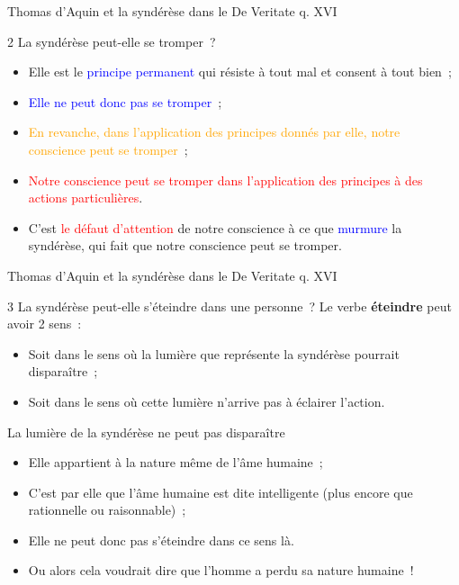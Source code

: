 \documentclass[11pt,xcolor=dvipsname,ignorenonframetext,handout]{beamer}
\begin{document}
\begin{frame}{Thomas d'Aquin et la syndérèse dans le De Veritate q. XVI}
    \begin{block}{2 La syndérèse peut-elle se tromper~?}
        \begin{itemize}
            \rightskip=0pt\leftskip=0pt
            \item Elle est le \textcolor{blue}{principe permanent} qui résiste à tout mal et consent à tout bien~;
            \item \textcolor{blue}{Elle ne peut donc pas se tromper}~;
            \item \textcolor{orange}{En revanche, dans l'application des principes donnés par elle, notre conscience peut se tromper}~;
            \item \textcolor{red}{Notre conscience peut se tromper dans l'application des principes à des actions particulières}.
            \item C'est \textcolor{red}{le défaut d'attention} de notre conscience à ce que \textcolor{blue}{murmure} la syndérèse, qui fait que notre conscience peut se tromper.
        \end{itemize}
    \end{block}
\end{frame}
\begin{frame}{Thomas d'Aquin et la syndérèse dans le De Veritate q. XVI}
    \begin{block}{3 La syndérèse peut-elle s'éteindre dans une personne~?}
        \rightskip=0pt\leftskip=0pt
            Le verbe \textbf{éteindre} peut avoir 2 sens~:
        \begin{itemize}
            \rightskip=0pt\leftskip=0pt
            \item Soit dans le sens où la lumière que représente la syndérèse pourrait disparaître~;
            \item Soit dans le sens où cette lumière n'arrive pas à éclairer l'action.
        \end{itemize}
    \end{block}
    \begin{exampleblock}{La lumière de la syndérèse ne peut pas disparaître}
        \begin{itemize}
            \rightskip=0pt\leftskip=0pt
            \item Elle appartient à la nature même de l'âme humaine~;
            \item C'est par elle que l'âme humaine est dite intelligente (plus encore que rationnelle ou raisonnable)~;
            \item Elle ne peut donc pas s'éteindre dans ce sens là.
            \item Ou alors cela voudrait dire que l'homme a perdu sa nature humaine~!
        \end{itemize}
    \end{exampleblock}
\end{frame}
\end{document}
